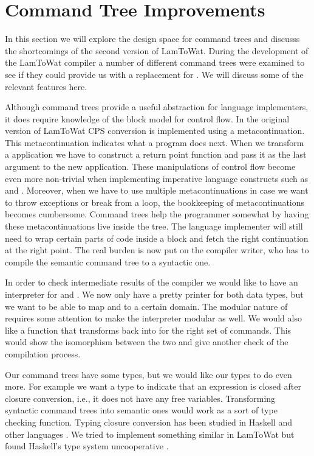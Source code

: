 \section{\label{section:ctreebetter}Command Tree Improvements}
In this section we will explore the design space for command trees and discusss the shortcomings of the second version of LamToWat. During the development of the LamToWat compiler a number of different command trees were examined to see if they could provide us with a replacement for . We will discuss some of the relevant features here.

Although command trees provide a useful abstraction for language implementers, it does require knowledge of the block model for control flow. In the original version of LamToWat CPS conversion is implemented using a metacontinuation. This metacontinuation indicates what a program does next. When we transform a application we have to construct a return point function and pass it as the last argument to the new application. These manipulations of control flow become even more non-trivial when implementing imperative language constructs such as  and . Moreover, when we have to use multiple metacontinuations in case we want to throw exceptions or break from a  loop, the bookkeeping of metacontinuations becomes cumbersome. Command trees help the programmer somewhat by having these metacontinuations live inside the tree. The language implementer will still need to wrap certain parts of code inside a block and fetch the right continuation at the right point. The real burden is now put on the compiler writer, who has to compile the semantic command tree to a syntactic one.

In order to check intermediate results of the compiler we would like to have an interpreter for  and . We now only have a pretty printer for both data types, but we want to be able to map  and  to a certain domain. The modular nature of  requires some attention to make the interpreter modular as well. We would also like a function that transforms  back into  for the right set of commands. This would show the isomorphism between the two and give another check of the compilation process.

Our command trees have some types, but we would like our types to do even more. For example we want a type to indicate that an expression is closed after closure conversion, i.e., it does not have any free variables. Transforming syntactic command trees into semantic ones would work as a sort of type checking function. Typing closure conversion has been studied in Haskell and other languages \autocite{DBLP:conf/haskell/GuillemetteM07, DBLP:conf/pldi/Chlipala07, DBLP:conf/popl/MorrisettWCG98}. We tried to implement something similar in LamToWat but found Haskell's type system uncooperative \autocite{10.1145/2578854.2503786}.

